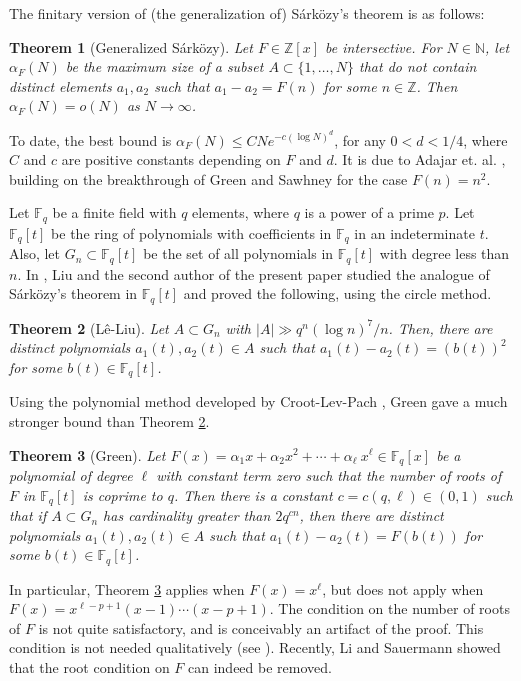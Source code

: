 \documentclass[11pt]{amsart}
\newcommand{\Z}{\mathbb{Z}}
\newcommand{\N}{\mathbb{N}}
\newcommand\Fq{{\mathbb{F}_q}}
\newtheorem{theorem}{Theorem}%
\theoremstyle{definition}
\theoremstyle{remark}
\begin{document}
The finitary version of (the generalization of) S\'ark\"ozy's theorem is as follows:

\begin{theorem}[Generalized S\'ark\"ozy] \label{sarkfi}
    Let $F \in \Z[x]$ be intersective. For $N\in \N$, let $\alpha_F(N)$ be the maximum size of a subset $A \subset \{1,\dots,N\}$ that do not contain distinct elements $a_1, a_2$ such that $a_1 - a_2 = F(n)$ for some $n \in \Z$. Then $\alpha_F(N) = o(N)$ as $N\rightarrow \infty$.     
\end{theorem}

To date, the best bound is $\alpha_F(N) \leq C N e^{- c (\log N)^d } $, for any $0 < d < 1/4$, where $C$ and $c$ are positive constants depending on $F$ and $d$. It is due to Adajar et. al. \cite{adajar}, building on the breakthrough of Green and Sawhney \cite{green-sawhney} for the case $F(n)=n^2$. 

Let $\Fq$ be a finite field with $q$ elements, where $q$ is a power of a prime $p$. Let $\Fq[t]$ be the ring of polynomials with coefficients in $\Fq$ in an indeterminate $t$. Also, let $G_n \subset \Fq[t]$ be the set of all polynomials in $\Fq[t]$ with degree less than $n$. In \cite{le}, Liu and the second author of the present paper studied the analogue of 
S\'ark\"ozy's theorem in $\Fq[t]$ and proved the following, using the circle method.

\begin{theorem}[L\^e-Liu] \label{leliu}
     Let $A\subset G_n$ with $|A|\gg q^n (\log n)^7/n$. Then, there are distinct polynomials $a_1(t),a_2(t) \in A$ such that $a_1(t)-a_2(t)=(b(t))^2$ for some $b(t)\in\mathbb{F}_q[t]$.
\end{theorem}
 
Using the polynomial method developed by Croot-Lev-Pach \cite{clp}, Green \cite{green} gave a much stronger bound than Theorem \ref{leliu}.
\begin{theorem}[Green] \label{gr}
	Let $F(x) = \alpha_1 x + \alpha_2 x^2 + \cdots + \alpha_\ell\ x^\ell \in\Fq[x]$ be a polynomial of degree $\ell$ with constant term zero such that the number of roots of $F$ in $\Fq[t]$ is coprime to $q$. Then there is a constant $c=c(q,\ell) \in (0,1)$ such that if $A\subset G_n$ has cardinality greater than $2q^{cn}$, then there are distinct polynomials $a_1(t), a_2(t)\in A$ such that $a_1(t)-a_2(t) = F(b(t))$ for some $b(t)\in \Fq[t]$.
\end{theorem}

In particular, Theorem \ref{gr} applies when $F(x)=x^\ell$, but does not apply when $F(x) = x^{\ell-p+1}(x-1)\cdots(x-p+1)$. The condition on the number of roots of $F$ is not quite satisfactory, and is conceivably an artifact of the proof. This condition is not needed qualitatively (see \cite[Section 6]{llw}).
Recently, Li and Sauermann \cite{li} showed that the root condition on $F$ can indeed be removed.
\end{document}
